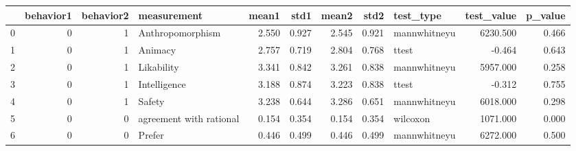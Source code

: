 \begin{tabular}{lrrlrrrrlrr}
\toprule
{} &  behavior1 &  behavior2 &              measurement &  mean1 &   std1 &  mean2 &   std2 &     test\_type &  test\_value &  p\_value \\
\midrule
0 &          0 &          1 &         Anthropomorphism &  2.550 &  0.927 &  2.545 &  0.921 &  mannwhitneyu &    6230.500 &    0.466 \\
1 &          0 &          1 &                  Animacy &  2.757 &  0.719 &  2.804 &  0.768 &         ttest &      -0.464 &    0.643 \\
2 &          0 &          1 &               Likability &  3.341 &  0.842 &  3.261 &  0.838 &  mannwhitneyu &    5957.000 &    0.258 \\
3 &          0 &          1 &             Intelligence &  3.188 &  0.874 &  3.223 &  0.838 &         ttest &      -0.312 &    0.755 \\
4 &          0 &          1 &                   Safety &  3.238 &  0.644 &  3.286 &  0.651 &  mannwhitneyu &    6018.000 &    0.298 \\
5 &          0 &          0 &  agreement with rational &  0.154 &  0.354 &  0.154 &  0.354 &      wilcoxon &    1071.000 &    0.000 \\
6 &          0 &          0 &                   Prefer &  0.446 &  0.499 &  0.446 &  0.499 &  mannwhitneyu &    6272.000 &    0.500 \\
\bottomrule
\end{tabular}
